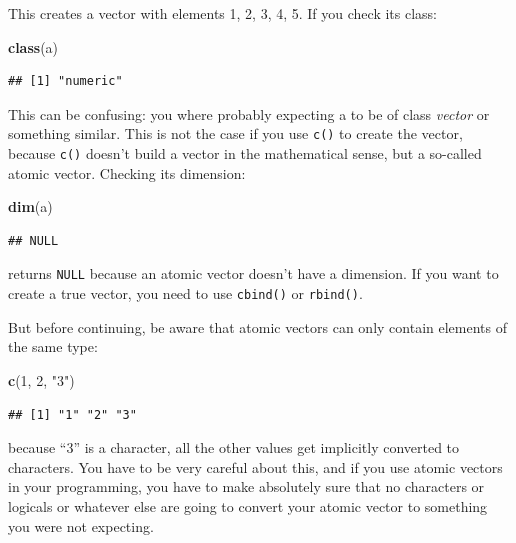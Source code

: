\documentclass[]{gitbook}
\newenvironment{Shaded}{\begin{snugshade}}{\end{snugshade}}
\newcommand{\DecValTok}[1]{\textcolor[rgb]{0.00,0.00,0.81}{#1}}
\newcommand{\KeywordTok}[1]{\textcolor[rgb]{0.13,0.29,0.53}{\textbf{#1}}}
\newcommand{\NormalTok}[1]{#1}
\newcommand{\StringTok}[1]{\textcolor[rgb]{0.31,0.60,0.02}{#1}}
\begin{document}
This creates a vector with elements 1, 2, 3, 4, 5. If you check its class:

\begin{Shaded}
\begin{Highlighting}[]
\KeywordTok{class}\NormalTok{(a)}
\end{Highlighting}
\end{Shaded}

\begin{verbatim}
## [1] "numeric"
\end{verbatim}

This can be confusing: you where probably expecting a to be of class \emph{vector} or
something similar. This is not the case if you use \texttt{c()} to create the vector, because \texttt{c()}
doesn't build a vector in the mathematical sense, but a so-called atomic vector.
Checking its dimension:

\begin{Shaded}
\begin{Highlighting}[]
\KeywordTok{dim}\NormalTok{(a)}
\end{Highlighting}
\end{Shaded}

\begin{verbatim}
## NULL
\end{verbatim}

returns \texttt{NULL} because an atomic vector doesn't have a dimension.
If you want to create a true vector, you need to use \texttt{cbind()} or \texttt{rbind()}.

But before continuing, be aware that atomic vectors can only contain elements of the same type:

\begin{Shaded}
\begin{Highlighting}[]
\KeywordTok{c}\NormalTok{(}\DecValTok{1}\NormalTok{, }\DecValTok{2}\NormalTok{, }\StringTok{"3"}\NormalTok{)}
\end{Highlighting}
\end{Shaded}

\begin{verbatim}
## [1] "1" "2" "3"
\end{verbatim}

because ``3'' is a character, all the other values get implicitly converted to characters. You have
to be very careful about this, and if you use atomic vectors in your programming, you have to make
absolutely sure that no characters or logicals or whatever else are going to convert your atomic
vector to something you were not expecting.
\end{document}
